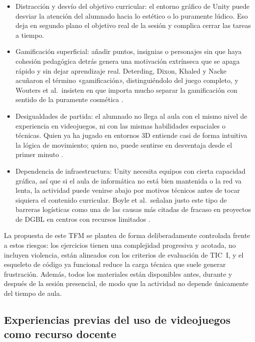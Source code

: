 \documentclass[a4paper,12pt]{article}
\begin{document}
\begin{itemize}
  \item Distracción y desvío del objetivo curricular: el entorno gráfico de Unity puede desviar la atención del alumnado hacia lo estético o lo puramente lúdico. Eso deja en segundo plano el objetivo real de la sesión y complica cerrar las tareas a tiempo.

  \item Gamificación superficial: añadir puntos, insignias o personajes sin que haya cohesión pedagógica detrás genera una motivación extrínseca que se apaga rápido y sin dejar aprendizaje real. Deterding, Dixon, Khaled y Nacke acuñaron el término «gamificación», distinguiéndolo del juego completo, y Wouters et al.\ insisten en que importa mucho separar la gamificación con sentido de la puramente cosmética \citep{deterding2011gamification, wouters2013meta}.

  \item Desigualdades de partida: el alumnado no llega al aula con el mismo nivel de experiencia en videojuegos, ni con las mismas habilidades espaciales o técnicas. Quien ya ha jugado en entornos 3D entiende casi de forma intuitiva la lógica de movimiento; quien no, puede sentirse en desventaja desde el primer minuto \citep{granic2014benefits}.

  \item Dependencia de infraestructura: Unity necesita equipos con cierta capacidad gráfica, así que si el aula de informática no está bien mantenida o la red va lenta, la actividad puede venirse abajo por motivos técnicos antes de tocar siquiera el contenido curricular. Boyle et al.\ señalan justo este tipo de barreras logísticas como una de las causas más citadas de fracaso en proyectos de DGBL en centros con recursos limitados \citep{boyle2016systematic}.
\end{itemize}

La propuesta de este TFM se plantea de forma deliberadamente controlada frente a estos riesgos: los ejercicios tienen una complejidad progresiva y acotada, no incluyen violencia, están alineados con los criterios de evaluación de TIC~I, y el esqueleto de código ya funcional reduce la carga técnica que suele generar frustración. Además, todos los materiales están disponibles antes, durante y después de la sesión presencial, de modo que la actividad no depende únicamente del tiempo de aula.

\subsection{Experiencias previas del uso de videojuegos como recurso docente}
\end{document}
